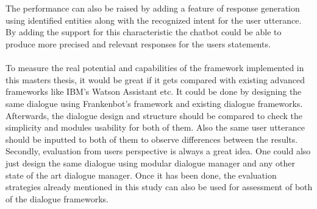 \\~\\
The performance can also be raised by adding a feature of response generation using identified entities along with the recognized intent for the user utterance. By adding the support for this characteristic the chatbot could be able to produce more precised and relevant responses for the users statements.
\\~\\
To measure the real potential and capabilities of the framework implemented in this masters thesis, it would be great if it gets compared with existing advanced frameworks like IBM's Watson Assistant etc. It could be done by designing the same dialogue using Frankenbot's framework and existing dialogue frameworks. Afterwards, the dialogue design and structure should be compared to check the simplicity and modules usability for both of them. Also the same user utterance should be inputted to both of them to observe differences between the results. Secondly, evaluation from users perspective is always a great idea. One could also just design the same dialogue using modular dialogue manager and any other state of the art dialogue manager. Once it has been done, the evaluation strategies already mentioned in this study can also be used for assessment of both of the dialogue frameworks.